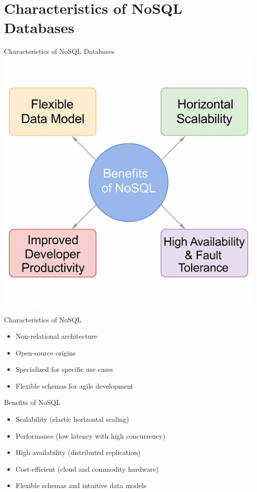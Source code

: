 \documentclass{beamer}
\begin{document}
\section{Characteristics of NoSQL Databases}

\begin{frame}{\centering Characteristics of NoSQL Databases}
\centering
\includegraphics[width=0.7\linewidth]{figures/nosql_benefits_diagram}
\end{frame}

\begin{frame}{Characteristics of NoSQL}
\begin{itemize}
    \item Non-relational architecture
    \item Open-source origins
    \item Specialized for specific use cases
    \item Flexible schemas for agile development
\end{itemize}
\end{frame}

\begin{frame}{Benefits of NoSQL}
\begin{itemize}
    \item Scalability (elastic horizontal scaling)
    \item Performance (low latency with high concurrency)
    \item High availability (distributed replication)
    \item Cost-efficient (cloud and commodity hardware)
    \item Flexible schemas and intuitive data models
\end{itemize}
\end{frame}
\end{document}
